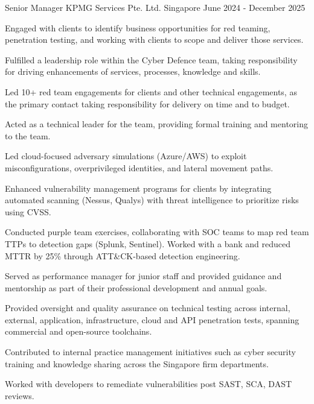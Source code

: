 \begin{cventries}
  \cventry
    {Senior Manager} %
    {KPMG Services Pte. Ltd.} %
    {Singapore} %
    {June 2024 - December 2025} %
    {
      \begin{cvitems} %
        \item{Engaged with clients to identify business opportunities for red teaming, penetration testing, and working with clients to scope and deliver those services.}
        \item{Fulfilled a leadership role within the Cyber Defence team, taking responsibility for driving enhancements of services, processes, knowledge and skills.}
        \item{Led 10+ red team engagements for clients and other technical engagements, as the primary contact taking responsibility for delivery on time and to budget.}
        \item{Acted as a technical leader for the team, providing formal training and mentoring to the team.}
        \item{Led cloud-focused adversary simulations (Azure/AWS) to exploit misconfigurations, overprivileged identities, and lateral movement paths.}
        \item{Enhanced vulnerability management programs for clients by integrating automated scanning (Nessus, Qualys) with threat intelligence to prioritize risks using CVSS.}
        \item{Conducted purple team exercises, collaborating with SOC teams to map red team TTPs to detection gaps (Splunk, Sentinel). Worked with a bank and reduced MTTR by 25\% through ATT\&CK-based detection engineering.}
        \item{Served as performance manager for junior staff and provided guidance and mentorship as part of their professional development and annual goals.}
        \item{Provided oversight and quality assurance on technical testing across internal, external, application, infrastructure, cloud and API penetration tests, spanning commercial and open-source toolchains.}
        \item{Contributed to internal practice management initiatives such as cyber security training and knowledge sharing across the Singapore firm departments.}
        \item{Worked with developers to remediate vulnerabilities post SAST, SCA, DAST reviews.}
      \end{cvitems}
    }
   


\end{cventries}
